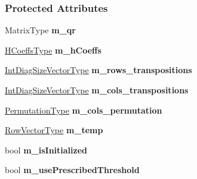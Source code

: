 \subsubsection*{Protected Attributes}
\begin{DoxyCompactItemize}
\item 
\mbox{\label{group___q_r___module_a657c098a9d524a3fad59738946d453cd}} 
Matrix\+Type {\bfseries m\+\_\+qr}
\item 
\mbox{\label{group___q_r___module_a46517e11768baccb40c86af85ae79a17}} 
\hyperlink{class_eigen_1_1internal_1_1_tensor_lazy_evaluator_writable}{H\+Coeffs\+Type} {\bfseries m\+\_\+h\+Coeffs}
\item 
\mbox{\label{group___q_r___module_a5f1c54d8e96a63ca5389633dadbf6bda}} 
\hyperlink{group___core___module}{Int\+Diag\+Size\+Vector\+Type} {\bfseries m\+\_\+rows\+\_\+transpositions}
\item 
\mbox{\label{group___q_r___module_a9c6e3d1e5dfc3ec43209f3c482e1c230}} 
\hyperlink{group___core___module}{Int\+Diag\+Size\+Vector\+Type} {\bfseries m\+\_\+cols\+\_\+transpositions}
\item 
\mbox{\label{group___q_r___module_a18b791e0f07c5a397fd3b073e78df6fc}} 
\hyperlink{group___core___module}{Permutation\+Type} {\bfseries m\+\_\+cols\+\_\+permutation}
\item 
\mbox{\label{group___q_r___module_ac2f0bbb8a7f1b3b0a5dd2b93780698aa}} 
\hyperlink{class_eigen_1_1internal_1_1_tensor_lazy_evaluator_writable}{Row\+Vector\+Type} {\bfseries m\+\_\+temp}
\item 
\mbox{\label{group___q_r___module_a549aa148136ab13e711980cdf0e0fcb0}} 
bool {\bfseries m\+\_\+is\+Initialized}
\item 
\mbox{\label{group___q_r___module_a7cb5a37affbae0f1fff1f16d078417a7}} 
bool {\bfseries m\+\_\+use\+Prescribed\+Threshold}
\item 
\mbox{\label{group___q_r___module_a9fc53f77872981ba211e5281d3bc5c1a}} 

\end{DoxyCompactItemize}
